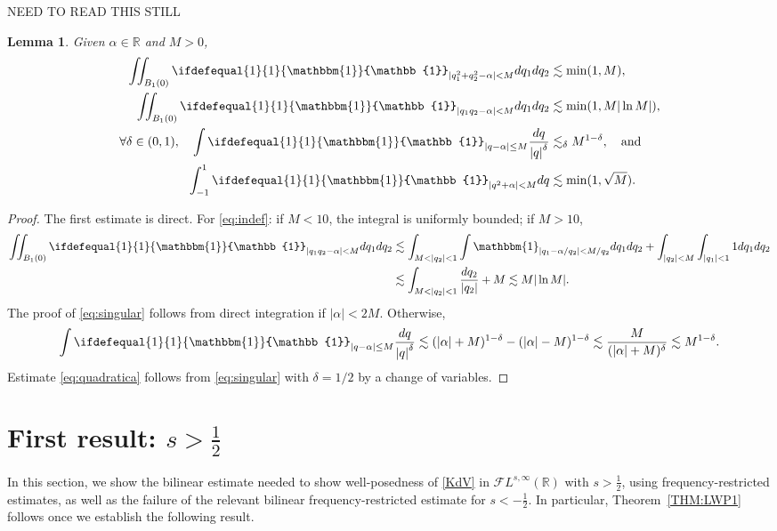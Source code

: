 \documentclass[a4paper, 11pt]{amsart}
\newcommand{\R}{\mathbb{R}}
\newcommand{\m}[1]{
	\ifdefequal{#1}{1}
	{\mathbbm{#1}}
	{\mathbb{#1}}
}
\theoremstyle{plain}
\newtheorem{lem}[thm]{Lemma}
\theoremstyle{definition}
\theoremstyle{remark}
\newcommand{\5}{\text{V}}
\newcommand{\FL}{\mathcal{F} L}
\numberwithin{equation}{section}
\theoremstyle{mytheoremstyle} \newtheorem{nota}[thm]{Remark}
\theoremstyle{mytheoremstyle} \newtheorem{exemplo}[thm]{Example}
\newcommand{\red}{\color{red}}
\newcommand{\blue}{\color{blue}}
\begin{document}
{
\red NEED TO READ THIS STILL

\blue
\begin{lem}\label{lem:quadraticas}
	Given $\alpha\in \R$ and $M>0$,
	\begin{align}\label{eq:posdef}
		\iint_{B_1(0)} \m 1_{|q_1^2+q_2^2-\alpha|<M}dq_1dq_2 &\lesssim \min(1,M), \\\label{eq:indef}
		\iint_{B_1(0)} \m 1_{|q_1q_2-\alpha|<M}dq_1dq_2 &\lesssim \min(1,M|\ln M|), \\
		\label{eq:singular}
		\forall \delta \in (0,1), \quad \int \m 1_{|q-\alpha| \le M} \frac{dq}{\left|q \right|^{\delta}} &\lesssim_{\delta} M^{1-\delta}, \quad \text{and} \quad \\
		\label{eq:quadratica}
		\int_{-1}^{1} \m 1_{|q^2  +\alpha | < M} dq &\lesssim \min(1,\sqrt M).
	\end{align}

\end{lem}

\begin{proof}
	The first estimate is direct. For \eqref{eq:indef}: if $M<10$, the integral is uniformly bounded; if $M>10$,
	\begin{align*}
		\iint_{B_1(0)} \m 1_{|q_1q_2-\alpha|<M}dq_1dq_2 &\lesssim \int_{M<|q_2|<1} \int \mathbbm{1}_{|q_1-\alpha/q_2|<M/q_2} dq_1dq_2 + \int_{|q_2|<M} \int_{|q_1|<1} 1 dq_1dq_2 \\&\lesssim \int_{M<|q_2|<1} \frac{dq_2}{|q_2|} + M \lesssim M|\ln M|.
	\end{align*}
	The proof of \eqref{eq:singular} follows from direct integration if $|\alpha|<2M$. Otherwise,
	$$
	\int \m 1_{|q-\alpha| \le M} \frac{dq}{\left|q \right|^{\delta}} \lesssim (|\alpha|+M)^{1-\delta}-(|\alpha|-M)^{1-\delta}\lesssim \frac{M}{(|\alpha|+M)^{\delta}} \lesssim M^{1-\delta}.
	$$
	Estimate \eqref{eq:quadratica} follows from \eqref{eq:singular} with $\delta=1/2$ by a change of variables.
\end{proof}
}


\section{First result: $s>\frac12$}

In this section, we show the bilinear estimate needed to show well-posedness of \eqref{KdV} in $\FL^{s,\infty}(\R)$ with $s>\frac12$, using frequency-restricted estimates, as well as the failure of the relevant bilinear frequency-restricted estimate for $s<-\frac12$.
In particular, Theorem~\ref{THM:LWP1} follows once we establish the following result.
\end{document}
